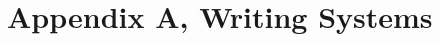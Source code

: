 \documentclass[b5paper,justified,nobib,nofonts]{tufte-book}
\begin{document}
\backmatter

\chapter{Appendix A, Writing Systems}
\label{ch:appendixa}


% 

% 
% 

\listoffigures

\listoftables

\printglosses[style=list]

\end{document}
